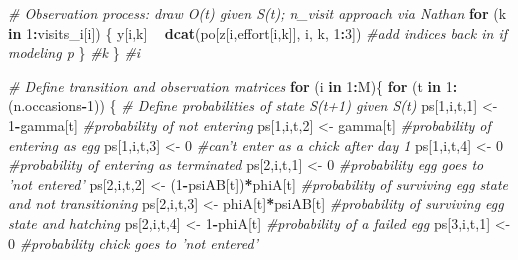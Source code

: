 \documentclass[]{article}
\newenvironment{Shaded}{\begin{snugshade}}{\end{snugshade}}
\newcommand{\KeywordTok}[1]{\textcolor[rgb]{0.13,0.29,0.53}{\textbf{#1}}}
\newcommand{\DecValTok}[1]{\textcolor[rgb]{0.00,0.00,0.81}{#1}}
\newcommand{\StringTok}[1]{\textcolor[rgb]{0.31,0.60,0.02}{#1}}
\newcommand{\CommentTok}[1]{\textcolor[rgb]{0.56,0.35,0.01}{\textit{#1}}}
\newcommand{\ControlFlowTok}[1]{\textcolor[rgb]{0.13,0.29,0.53}{\textbf{#1}}}
\newcommand{\OperatorTok}[1]{\textcolor[rgb]{0.81,0.36,0.00}{\textbf{#1}}}
\newcommand{\NormalTok}[1]{#1}
\begin{document}
\begin{Shaded}
\begin{Highlighting}[]
  \CommentTok{# Observation process: draw O(t) given S(t); n_visit approach via Nathan}
  \ControlFlowTok{for}\NormalTok{ (k }\ControlFlowTok{in} \DecValTok{1}\OperatorTok{:}\NormalTok{visits_i[i]) \{  }
\NormalTok{  y[i,k] }\OperatorTok{~}\StringTok{ }\KeywordTok{dcat}\NormalTok{(po[z[i,effort[i,k]], i, k, }\DecValTok{1}\OperatorTok{:}\DecValTok{3}\NormalTok{]) }\CommentTok{#add indices back in if modeling p}
\NormalTok{  \} }\CommentTok{#k}
\NormalTok{\} }\CommentTok{#i}

\CommentTok{# Define transition and observation matrices}
 \ControlFlowTok{for}\NormalTok{ (i }\ControlFlowTok{in} \DecValTok{1}\OperatorTok{:}\NormalTok{M)\{}
  \ControlFlowTok{for}\NormalTok{ (t }\ControlFlowTok{in} \DecValTok{1}\OperatorTok{:}\NormalTok{(n.occasions}\OperatorTok{-}\DecValTok{1}\NormalTok{)) \{}
      \CommentTok{# Define probabilities of state S(t+1) given S(t)   }
\NormalTok{      ps[}\DecValTok{1}\NormalTok{,i,t,}\DecValTok{1}\NormalTok{] <-}\StringTok{ }\DecValTok{1}\OperatorTok{-}\NormalTok{gamma[t]                    }\CommentTok{#probability of not entering}
\NormalTok{      ps[}\DecValTok{1}\NormalTok{,i,t,}\DecValTok{2}\NormalTok{] <-}\StringTok{ }\NormalTok{gamma[t]                    }\CommentTok{#probability of entering as egg}
\NormalTok{      ps[}\DecValTok{1}\NormalTok{,i,t,}\DecValTok{3}\NormalTok{] <-}\StringTok{ }\DecValTok{0}                          \CommentTok{#can't enter as a chick after day 1}
\NormalTok{      ps[}\DecValTok{1}\NormalTok{,i,t,}\DecValTok{4}\NormalTok{] <-}\StringTok{ }\DecValTok{0}                             \CommentTok{#probability of entering as terminated}
\NormalTok{      ps[}\DecValTok{2}\NormalTok{,i,t,}\DecValTok{1}\NormalTok{] <-}\StringTok{ }\DecValTok{0}                             \CommentTok{#probability egg goes to 'not entered'}
\NormalTok{      ps[}\DecValTok{2}\NormalTok{,i,t,}\DecValTok{2}\NormalTok{] <-}\StringTok{ }\NormalTok{(}\DecValTok{1}\OperatorTok{-}\NormalTok{psiAB[t])}\OperatorTok{*}\NormalTok{phiA[t]          }\CommentTok{#probability of surviving egg state and not transitioning}
\NormalTok{      ps[}\DecValTok{2}\NormalTok{,i,t,}\DecValTok{3}\NormalTok{] <-}\StringTok{ }\NormalTok{phiA[t]}\OperatorTok{*}\NormalTok{psiAB[t]              }\CommentTok{#probability of surviving egg state and hatching}
\NormalTok{      ps[}\DecValTok{2}\NormalTok{,i,t,}\DecValTok{4}\NormalTok{] <-}\StringTok{ }\DecValTok{1}\OperatorTok{-}\NormalTok{phiA[t]                      }\CommentTok{#probability of a failed egg}
\NormalTok{      ps[}\DecValTok{3}\NormalTok{,i,t,}\DecValTok{1}\NormalTok{] <-}\StringTok{ }\DecValTok{0}                                \CommentTok{#probability chick goes to 'not entered'}

\end{Highlighting}
\end{Shaded}
\end{document}
